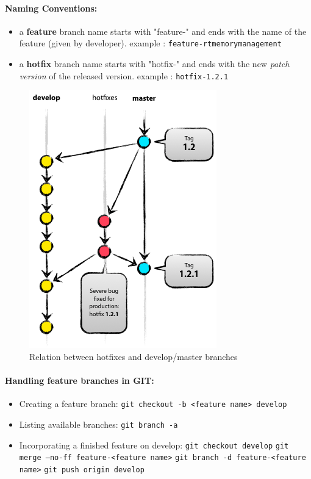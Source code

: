 \documentclass[12pt,a4paper]{article}
\begin{document}
\paragraph{Naming Conventions:}
\begin{itemize}
\item a \textbf{feature} branch name starts with "feature-" and ends with the name of the feature (given by developer).
\linebreak example : \texttt{feature-rtmemorymanagement}
\item a \textbf{hotfix} branch name starts with "hotfix-" and ends with the new \textit{patch version} of the released version.
\linebreak example : \texttt{hotfix-1.2.1}
\end{itemize}


\begin{figure}
\center
\includegraphics[scale=0.6]{images/hotfixbranching.png}
\caption{Relation between hotfixes and develop/master branches}
\end{figure}

\paragraph{Handling feature branches in GIT:}
\begin{itemize}
\item Creating a feature branch:
\linebreak \texttt{git checkout -b <feature name> develop}
\item Listing available branches:
\linebreak \texttt{git branch -a}
\item Incorporating a finished feature on develop:
\linebreak \texttt{git checkout develop}
\linebreak \texttt{git merge --no-ff feature-<feature name>}
\linebreak \texttt{git branch -d  feature-<feature name>}
\linebreak \texttt{git push origin develop}
\end{itemize}
\end{document}

